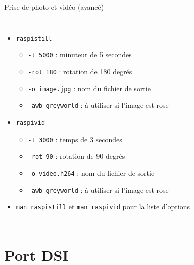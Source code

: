 \documentclass[aspectratio=169,xcolor=dvipsnames]{beamer}
\begin{document}
\begin{frame}{Prise de photo et vidéo (avancé)}
    \begin{columns}[c] %

        \begin{itemize}
            \item \texttt{raspistill}
            \begin{itemize}
                \item \texttt{-t 5000} : minuteur de 5 secondes
                \item \texttt{-rot 180} : rotation de 180 degrés
                \item \texttt{-o image.jpg} : nom du fichier de sortie
                \item \texttt{-awb greyworld} : à utiliser si l'image est rose
            \end{itemize}
            \item \texttt{raspivid}
            \begin{itemize}
                \item \texttt{-t 3000} : temps de 3 secondes
                \item \texttt{-rot 90} : rotation de 90 degrés
                \item \texttt{-o video.h264} : nom du fichier de sortie
                \item \texttt{-awb greyworld} : à utiliser si l'image est rose
            \end{itemize}
            \item \texttt{man raspistill} et \texttt{man raspivid} pour la liste d'options
        \end{itemize}

    \end{columns}
\end{frame}


\section{Port DSI}
\end{document}
